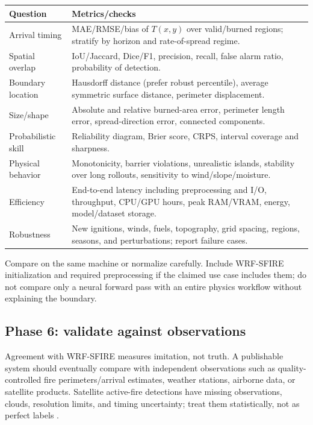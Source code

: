 \documentclass[11pt]{article}
\begin{document}
\begin{longtable}{p{}p{}}
\toprule
\textbf{Question} & \textbf{Metrics/checks} \\
\midrule
Arrival timing & MAE/RMSE/bias of $T(x,y)$ over valid/burned regions; stratify by horizon and rate-of-spread regime. \\
Spatial overlap & IoU/Jaccard, Dice/F1, precision, recall, false alarm ratio, probability of detection. \\
Boundary location & Hausdorff distance (prefer robust percentile), average symmetric surface distance, perimeter displacement. \\
Size/shape & Absolute and relative burned-area error, perimeter length error, spread-direction error, connected components. \\
Probabilistic skill & Reliability diagram, Brier score, CRPS, interval coverage and sharpness. \\
Physical behavior & Monotonicity, barrier violations, unrealistic islands, stability over long rollouts, sensitivity to wind/slope/moisture. \\
Efficiency & End-to-end latency including preprocessing and I/O, throughput, CPU/GPU hours, peak RAM/VRAM, energy, model/dataset storage. \\
Robustness & New ignitions, winds, fuels, topography, grid spacing, regions, seasons, and perturbations; report failure cases. \\
\bottomrule
\end{longtable}

Compare on the same machine or normalize carefully. Include WRF-SFIRE initialization and required preprocessing if the claimed use case includes them; do not compare only a neural forward pass with an entire physics workflow without explaining the boundary.

\subsection{Phase 6: validate against observations}

Agreement with WRF-SFIRE measures imitation, not truth. A publishable system should eventually compare with independent observations such as quality-controlled fire perimeters/arrival estimates, weather stations, airborne data, or satellite products. Satellite active-fire detections have missing observations, clouds, resolution limits, and timing uncertainty; treat them statistically, not as perfect labels \cite{mandelAssimilation}.
\end{document}
